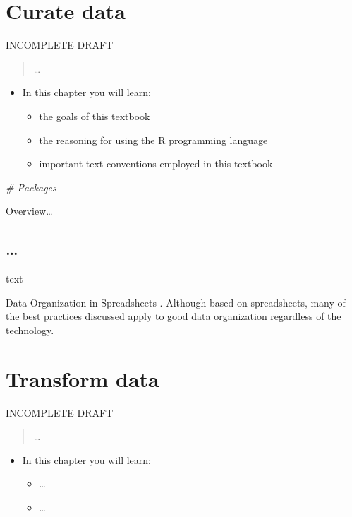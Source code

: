 \documentclass[
]{article}
\newenvironment{Shaded}{\begin{snugshade}}{\end{snugshade}}
\newcommand{\CommentTok}[1]{\textcolor[rgb]{0.56,0.35,0.01}{\textit{#1}}}
\providecommand{\tightlist}{%
  \setlength{\itemsep}{0pt}\setlength{\parskip}{0pt}}
\newenvironment{rmdblock}[1]
  {\begin{shaded*}
  \begin{itemize}
  \renewcommand{\labelitemi}{
    \raisebox{-.5\height}[0pt][0pt]{
      {\setkeys{Gin}{width=2em,keepaspectratio}\texttt{[image: assets/images/\#1]}}
    }
  }
  \item
  }
  {
  \end{itemize}
  \end{shaded*}
  }
\newenvironment{rmdkey}
  {\begin{rmdblock}{key}}
  {\end{rmdblock}}
\begin{document}
\hypertarget{curate-data}{%
\section{Curate data}\label{curate-data}}

INCOMPLETE DRAFT

\begin{quote}
\ldots{}
\end{quote}

\begin{rmdkey}
In this chapter you will learn:

\begin{itemize}
\tightlist
\item
  the goals of this textbook
\item
  the reasoning for using the R programming language
\item
  important text conventions employed in this textbook
\end{itemize}
\end{rmdkey}

\begin{Shaded}
\begin{Highlighting}[]
\CommentTok{\# Packages}
\end{Highlighting}
\end{Shaded}

Overview\ldots{}

\hypertarget{section-1}{%
\subsection{\ldots{}}\label{section-1}}

text

Data Organization in Spreadsheets \citep{Broman2018}. Although based on spreadsheets, many of the best practices discussed apply to good data organization regardless of the technology.

\hypertarget{transform-data}{%
\section{Transform data}\label{transform-data}}

INCOMPLETE DRAFT

\begin{quote}
\ldots{}
\end{quote}

\begin{rmdkey}
In this chapter you will learn:

\begin{itemize}
\tightlist
\item
  \ldots{}
\item
  \ldots{}
\end{itemize}
\end{rmdkey}
\end{document}
